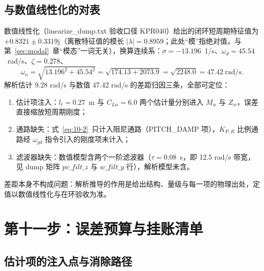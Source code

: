 \documentclass[11pt,a4paper]{ctexart}
\begin{document}
\subsection{与数值线性化的对表}

数值线性化（linearize\_dump.txt 验收口径 KPR040）给出的闭环短周期特征值为 $+0.8321\pm 0.3319\mathrm{j}$（离散特征值的模长 $|\lambda|=0.8959$；此处“模”指绝对值，与第~\ref{sec:modal}~章“模态”一词无关），换算连续系：$\sigma=-13.196$~1/s、$\omega_d=45.54$~rad/s、$\zeta=0.278$、
\[
\omega_n = \sqrt{13.196^2+45.54^2} = \sqrt{174.13+2073.9} = \sqrt{2248.0} = 47.42\ \mathrm{rad/s}.
\]
解析估计 9.28 rad/s 与数值 47.42 rad/s 的差距归因三条，全部可定位：
\begin{enumerate}[itemsep=2pt]
  \item 估计项注入：$l_t=0.27$~m 与 $C_{L\alpha}=6.0$ 两个估计量分别进入 $M_\alpha$ 与 $Z_w$，误差直接缩放短周期刚度；
  \item 通路缺失：式~\eqref{eq:10-2}~只计入阻尼通路（PITCH\_DAMP 项），$K_{P,R}$ 比例通路经 $\omega_{yd}$ 指令引入的刚度项未计入；
  \item 滤波器缺失：数值模型含两个一阶滤波器（$\tau=0.08$~s，即 12.5 rad/s 带宽，见 dump 矩阵 $pv\_filt\_z$ 与 $w\_filt\_y$ 行），解析模型未含。
\end{enumerate}
差距本身不构成问题：解析推导的作用是给出结构、量级与每一项的物理出处，定值以数值线性化与在环验收为准。

\section{第十一步：误差预算与挂账清单}\label{sec:budget}

\subsection{估计项的注入点与消除路径}
\end{document}
